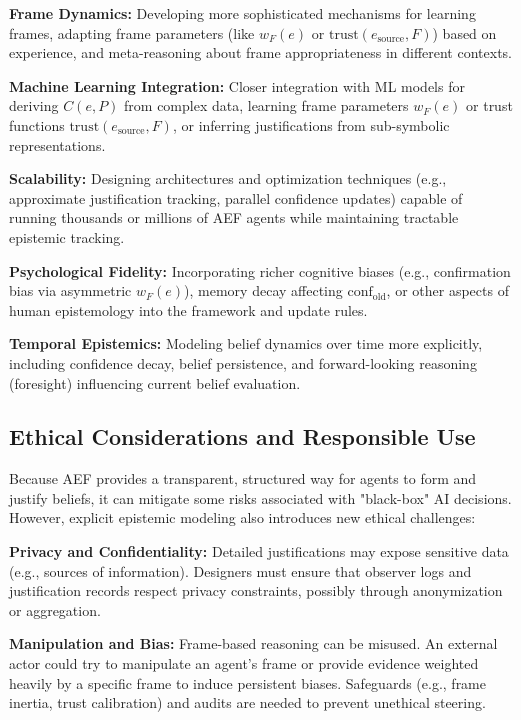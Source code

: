 \documentclass[10pt,a4paper]{article}
\begin{document}
\textbf{Frame Dynamics:} Developing more sophisticated mechanisms for learning frames, adapting frame parameters (like $w_F(e)$ or $\mathrm{trust}(e_{\mathrm{source}}, F)$) based on experience, and meta-reasoning about frame appropriateness in different contexts.

\textbf{Machine Learning Integration:} Closer integration with ML models for deriving $C(e, P)$ from complex data, learning frame parameters $w_F(e)$ or trust functions $\mathrm{trust}(e_{\mathrm{source}}, F)$, or inferring justifications from sub-symbolic representations.

\textbf{Scalability:} Designing architectures and optimization techniques (e.g., approximate justification tracking, parallel confidence updates) capable of running thousands or millions of AEF agents while maintaining tractable epistemic tracking.

\textbf{Psychological Fidelity:} Incorporating richer cognitive biases (e.g., confirmation bias via asymmetric $w_F(e)$), memory decay affecting $\mathrm{conf}_{\mathrm{old}}$, or other aspects of human epistemology into the framework and update rules.

\textbf{Temporal Epistemics:} Modeling belief dynamics over time more explicitly, including confidence decay, belief persistence, and forward-looking reasoning (foresight) influencing current belief evaluation.

\subsection{Ethical Considerations and Responsible Use}
Because AEF provides a transparent, structured way for agents to form and justify beliefs, it can mitigate some risks associated with "black-box" AI decisions. However, explicit epistemic modeling also introduces new ethical challenges:

\textbf{Privacy and Confidentiality:} Detailed justifications may expose sensitive data (e.g., sources of information). Designers must ensure that observer logs and justification records respect privacy constraints, possibly through anonymization or aggregation.

\textbf{Manipulation and Bias:} Frame-based reasoning can be misused. An external actor could try to manipulate an agent's frame or provide evidence weighted heavily by a specific frame to induce persistent biases. Safeguards (e.g., frame inertia, trust calibration) and audits are needed to prevent unethical steering.
\end{document}
